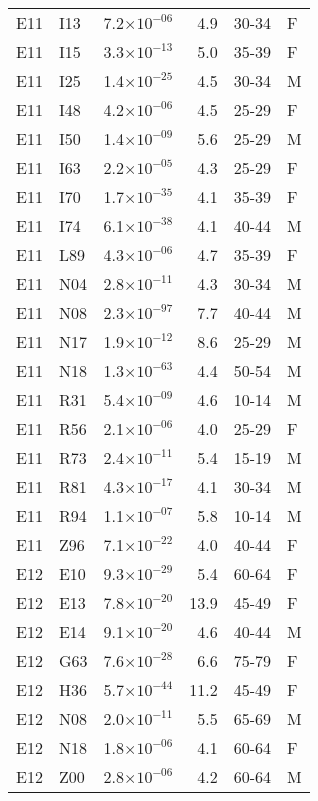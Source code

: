 \begin{longtable}{lllrll}
   E11 & I13 & 7.2$\times10^{-06}$ & 4.9 & 30-34 & F \\ 
   E11 & I15 & 3.3$\times10^{-13}$ & 5.0 & 35-39 & F \\ 
   E11 & I25 & 1.4$\times10^{-25}$ & 4.5 & 30-34 & M \\ 
   E11 & I48 & 4.2$\times10^{-06}$ & 4.5 & 25-29 & F \\ 
   E11 & I50 & 1.4$\times10^{-09}$ & 5.6 & 25-29 & M \\ 
   E11 & I63 & 2.2$\times10^{-05}$ & 4.3 & 25-29 & F \\ 
   E11 & I70 & 1.7$\times10^{-35}$ & 4.1 & 35-39 & F \\ 
   E11 & I74 & 6.1$\times10^{-38}$ & 4.1 & 40-44 & M \\ 
   E11 & L89 & 4.3$\times10^{-06}$ & 4.7 & 35-39 & F \\ 
   E11 & N04 & 2.8$\times10^{-11}$ & 4.3 & 30-34 & M \\ 
   E11 & N08 & 2.3$\times10^{-97}$ & 7.7 & 40-44 & M \\ 
   E11 & N17 & 1.9$\times10^{-12}$ & 8.6 & 25-29 & M \\ 
   E11 & N18 & 1.3$\times10^{-63}$ & 4.4 & 50-54 & M \\ 
   E11 & R31 & 5.4$\times10^{-09}$ & 4.6 & 10-14 & M \\ 
   E11 & R56 & 2.1$\times10^{-06}$ & 4.0 & 25-29 & F \\ 
   E11 & R73 & 2.4$\times10^{-11}$ & 5.4 & 15-19 & M \\ 
   E11 & R81 & 4.3$\times10^{-17}$ & 4.1 & 30-34 & M \\ 
   E11 & R94 & 1.1$\times10^{-07}$ & 5.8 & 10-14 & M \\ 
   E11 & Z96 & 7.1$\times10^{-22}$ & 4.0 & 40-44 & F \\ 
   E12 & E10 & 9.3$\times10^{-29}$ & 5.4 & 60-64 & F \\ 
   E12 & E13 & 7.8$\times10^{-20}$ & 13.9 & 45-49 & F \\ 
   E12 & E14 & 9.1$\times10^{-20}$ & 4.6 & 40-44 & M \\ 
   E12 & G63 & 7.6$\times10^{-28}$ & 6.6 & 75-79 & F \\ 
   E12 & H36 & 5.7$\times10^{-44}$ & 11.2 & 45-49 & F \\ 
   E12 & N08 & 2.0$\times10^{-11}$ & 5.5 & 65-69 & M \\ 
   E12 & N18 & 1.8$\times10^{-06}$ & 4.1 & 60-64 & F \\ 
   E12 & Z00 & 2.8$\times10^{-06}$ & 4.2 & 60-64 & M \\ 

\end{longtable}
